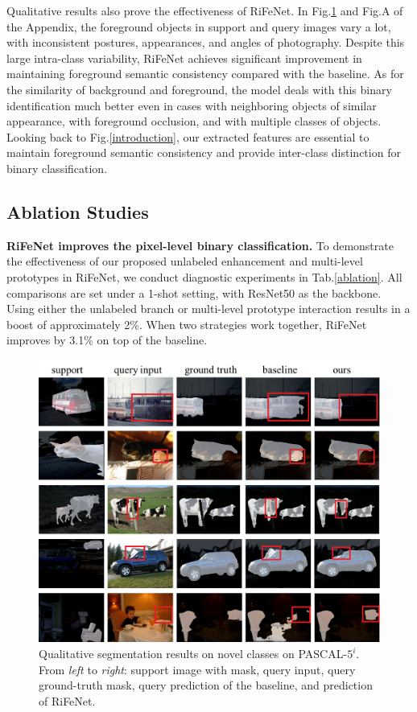 \documentclass[letterpaper]{article} %
\begin{document}
Qualitative results also prove the effectiveness of RiFeNet. In Fig.\ref{segresult} and Fig.A of the Appendix, the foreground objects in support and query images vary a lot, with inconsistent postures, appearances, and angles of photography. Despite this large intra-class variability, RiFeNet achieves significant improvement in maintaining foreground semantic consistency compared with the baseline. As for the similarity of background and foreground, the model deals with this binary identification much better even in cases with neighboring objects of similar appearance, with foreground occlusion, and with multiple classes of objects. Looking back to Fig.\ref{introduction}, our extracted features are essential to maintain foreground semantic consistency and provide inter-class distinction for binary classification.

\subsection{Ablation Studies}

\textbf{RiFeNet improves the pixel-level binary classification.}
To demonstrate the effectiveness of our proposed unlabeled enhancement and multi-level prototypes in RiFeNet, we conduct diagnostic experiments in Tab.\ref{ablation}. All comparisons are set under a 1-shot setting, with ResNet50 as the backbone. Using either the unlabeled branch or multi-level prototype interaction results in a boost of approximately 2\%. When two strategies work together, RiFeNet improves by 3.1\% on top of the baseline.
\begin{figure}[!t]
\centering
\includegraphics[width=0.95\linewidth]{vis.pdf}
\caption{Qualitative segmentation results on novel classes on PASCAL-$5^i$. From \textit{left} to \textit{right}: support image with mask, query input, query ground-truth mask, query prediction of the baseline, and prediction of RiFeNet.}
\label{segresult}
\end{figure}
\end{document}
